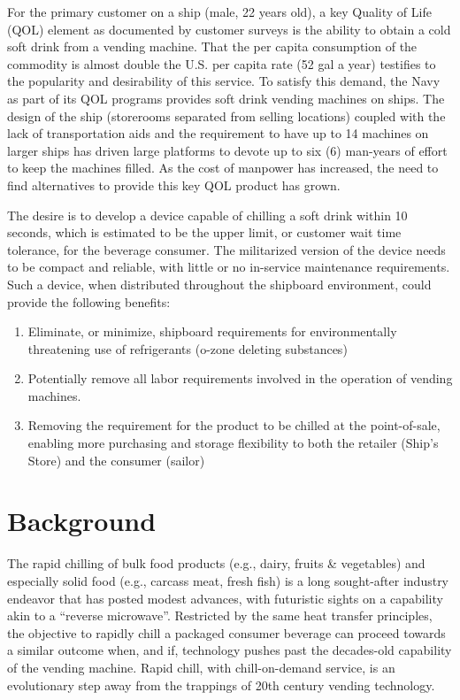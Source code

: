 \documentclass[
]{book}
\providecommand{\tightlist}{%
  \setlength{\itemsep}{0pt}\setlength{\parskip}{0pt}}
\begin{document}
For the primary customer on a ship (male, 22 years old), a key Quality of Life (QOL) element as documented by customer surveys is the ability to obtain a cold soft drink from a vending machine. That the per capita consumption of the commodity is almost double the U.S. per capita rate (52 gal a year) testifies to the popularity and desirability of this service. To satisfy this demand, the Navy as part of its QOL programs provides soft drink vending machines on ships. The design of the ship (storerooms separated from selling locations) coupled with the lack of transportation aids and the requirement to have up to 14 machines on larger ships has driven large platforms to devote up to six (6) man-years of effort to keep the machines filled. As the cost of manpower has increased, the need to find alternatives to provide this key QOL product has grown.

The desire is to develop a device capable of chilling a soft drink within 10 seconds, which is estimated to be the upper limit, or customer wait time tolerance, for the beverage consumer. The militarized version of the device needs to be compact and reliable, with little or no in-service maintenance requirements. Such a device, when distributed throughout the shipboard environment, could provide the following benefits:

\begin{enumerate}
\def\labelenumi{\arabic{enumi}.}
\tightlist
\item
  Eliminate, or minimize, shipboard requirements for environmentally threatening use of refrigerants (o-zone deleting substances)\\
\item
  Potentially remove all labor requirements involved in the operation of vending machines.\\
\item
  Removing the requirement for the product to be chilled at the point-of-sale, enabling more purchasing and storage flexibility to both the retailer (Ship's Store) and the consumer (sailor)
\end{enumerate}

\hypertarget{background}{%
\section{Background}\label{background}}

The rapid chilling of bulk food products (e.g., dairy, fruits \& vegetables) and especially solid food (e.g., carcass meat, fresh fish) is a long sought-after industry endeavor that has posted modest advances, with futuristic sights on a capability akin to a ``reverse microwave''. Restricted by the same heat transfer principles, the objective to rapidly chill a packaged consumer beverage can proceed towards a similar outcome when, and if, technology pushes past the decades-old capability of the vending machine. Rapid chill, with chill-on-demand service, is an evolutionary step away from the trappings of 20th century vending technology.
\end{document}
